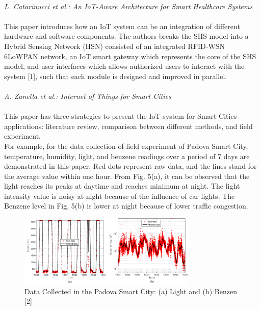 \documentclass[conference]{IEEEtran}
\begin{document}
\\
\textit{L. Catarinucci et al.: An IoT-Aware Architecture for Smart Healthcare Systems}
\\
\\
\text{\quad} This paper introduces how an IoT system can be an integration of different hardware and software components. The authors breaks the SHS model into a Hybrid Sensing Network (HSN) consisted of an integrated
RFID-WSN 6LoWPAN network, an IoT smart gateway which represents the core of the SHS model, and user interfaces which allows authorized users to interact with the system [1], such that each module is designed and improved in parallel.
\\
\\
\textit{A. Zanella et al.: Internet of Things for Smart Cities}
\\
\\
\text{\quad} This paper has three strategies to present the IoT system for Smart Cities applications: literature review, comparison between different methods, and field experiment.\\
\text{\quad} For example, for the data collection of field experiment of Padova Smart City, temperature, humidity, light, and benzene readings over a period of 7 days are demonstrated in this paper. Red dots represent raw data, and the lines stand for the average value within one hour. From Fig. 5(a), it can be observed that the light reaches its peaks at daytime and reaches minimum at night. The light intensity value is noisy at night because of the influence of car lights. The Benzene level in Fig. 5(b) is lower at night because of lower traffic congestion.
\begin{figure}[htbp]
\centerline{\includegraphics[width=8.5cm]{5.png}}
\caption{Data Collected in the Padova Smart City: (a) Light and (b) Benzen [2]}
\label{fig}
\end{figure}
\end{document}
